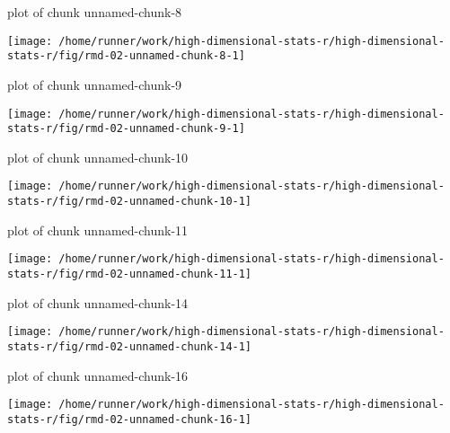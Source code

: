 \documentclass[ignorenonframetext,]{beamer}
\begin{document}
\begin{frame}{plot of chunk unnamed-chunk-8}
\protect\hypertarget{plot-of-chunk-unnamed-chunk-8}{}

\texttt{[image: /home/runner/work/high-dimensional-stats-r/high-dimensional-stats-r/fig/rmd-02-unnamed-chunk-8-1]}



\end{frame}

\begin{frame}{plot of chunk unnamed-chunk-9}
\protect\hypertarget{plot-of-chunk-unnamed-chunk-9}{}

\texttt{[image: /home/runner/work/high-dimensional-stats-r/high-dimensional-stats-r/fig/rmd-02-unnamed-chunk-9-1]}



\end{frame}

\begin{frame}{plot of chunk unnamed-chunk-10}
\protect\hypertarget{plot-of-chunk-unnamed-chunk-10}{}

\texttt{[image: /home/runner/work/high-dimensional-stats-r/high-dimensional-stats-r/fig/rmd-02-unnamed-chunk-10-1]}



\end{frame}

\begin{frame}{plot of chunk unnamed-chunk-11}
\protect\hypertarget{plot-of-chunk-unnamed-chunk-11}{}

\texttt{[image: /home/runner/work/high-dimensional-stats-r/high-dimensional-stats-r/fig/rmd-02-unnamed-chunk-11-1]}



\end{frame}

\begin{frame}{plot of chunk unnamed-chunk-14}
\protect\hypertarget{plot-of-chunk-unnamed-chunk-14}{}

\texttt{[image: /home/runner/work/high-dimensional-stats-r/high-dimensional-stats-r/fig/rmd-02-unnamed-chunk-14-1]}



\end{frame}

\begin{frame}{plot of chunk unnamed-chunk-16}
\protect\hypertarget{plot-of-chunk-unnamed-chunk-16}{}

\texttt{[image: /home/runner/work/high-dimensional-stats-r/high-dimensional-stats-r/fig/rmd-02-unnamed-chunk-16-1]}



\end{frame}
\end{document}
